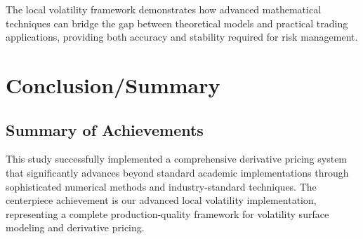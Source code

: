 \documentclass[11pt,a4paper]{article}
\begin{document}
The local volatility framework demonstrates how advanced mathematical techniques can bridge the gap between theoretical models and practical trading applications, providing both accuracy and stability required for risk management.

\section{Conclusion/Summary}

\subsection{Summary of Achievements}

This study successfully implemented a comprehensive derivative pricing system that significantly advances beyond standard academic implementations through sophisticated numerical methods and industry-standard techniques. The centerpiece achievement is our advanced local volatility implementation, representing a complete production-quality framework for volatility surface modeling and derivative pricing.
\end{document}
